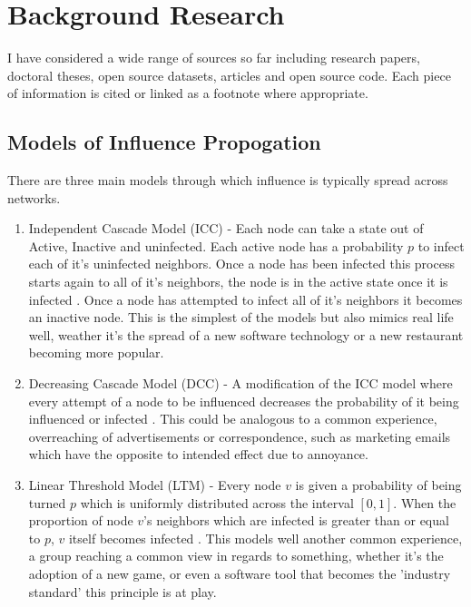 \documentclass{article}
\begin{document}



\section{Background Research}

I have considered a wide range of sources so far including research papers, doctoral theses, open source datasets, articles and open source code.
Each piece of information is cited or linked as a footnote where appropriate.

\subsection{Models of Influence Propogation}
There are three main models through which influence is typically spread across networks.

\begin{enumerate}
	\item Independent Cascade Model (ICC) - Each node can take a state out of Active, Inactive and uninfected.
	      Each active node has a probability $p$ to infect each of it's uninfected neighbors.
	      Once a node has been infected this process starts again to all of it's neighbors, the node is in the active state once it is infected \cite{kempe2003}.
	      Once a node has attempted to infect all of it's neighbors it becomes an inactive node.
	      This is the simplest of the models but also mimics real life well, weather it's the spread of a new software technology or a new restaurant becoming more popular.
	\item Decreasing Cascade Model (DCC) - A modification of the ICC model where every attempt of a node to be influenced decreases the probability of it being influenced or infected \cite{kempe2005influential}.
	      This could be analogous to a common experience, overreaching of advertisements or correspondence, such as marketing emails which have the opposite to intended effect due to annoyance.
	\item Linear Threshold Model (LTM) - Every node $v$ is given a probability of being turned $p$ which is uniformly distributed across the interval $[0, 1]$. When the proportion of node $v$'s neighbors which are infected is greater than or equal to $p$, $v$ itself becomes infected \cite{kempe2003}.
	      This models well another common experience, a group reaching a common view in regards to something, whether it's the adoption of a new game, or even a software tool that becomes the 'industry standard' this principle is at play.
\end{enumerate}
\end{document}
